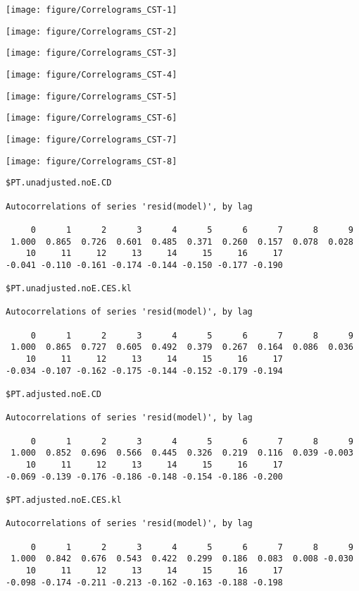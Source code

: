 \documentclass[preprint,authoryear,12pt]{elsarticle}\usepackage[]{graphicx}\usepackage[]{color}
\makeatletter
\def\maxwidth{ %
  \ifdim\Gin@nat@width>\linewidth
    \linewidth
  \else
    \Gin@nat@width
  \fi
}
\newenvironment{kframe}{%
 \def\at@end@of@kframe{}%
 \ifinner\ifhmode%
  \def\at@end@of@kframe{\end{minipage}}%
  \begin{minipage}{\columnwidth}%
 \fi\fi%
 \def\FrameCommand##1{\hskip\@totalleftmargin \hskip-\fboxsep
 \colorbox{shadecolor}{##1}\hskip-\fboxsep
     \hskip-\linewidth \hskip-\@totalleftmargin \hskip\columnwidth}%
 \MakeFramed {\advance\hsize-\width
   \@totalleftmargin\z@ \linewidth\hsize
   \@setminipage}}%
 {\par\unskip\endMakeFramed%
 \at@end@of@kframe}
\newenvironment{knitrout}{}{} %
\makeatother
\begin{document}
\begin{knitrout}
\color{fgcolor}
\texttt{[image: figure/Correlograms\_CST-1]} 

\texttt{[image: figure/Correlograms\_CST-2]} 

\texttt{[image: figure/Correlograms\_CST-3]} 

\texttt{[image: figure/Correlograms\_CST-4]} 

\texttt{[image: figure/Correlograms\_CST-5]} 

\texttt{[image: figure/Correlograms\_CST-6]} 

\texttt{[image: figure/Correlograms\_CST-7]} 

\texttt{[image: figure/Correlograms\_CST-8]} 
\begin{kframe}\begin{verbatim}
$PT.unadjusted.noE.CD

Autocorrelations of series 'resid(model)', by lag

     0      1      2      3      4      5      6      7      8      9 
 1.000  0.865  0.726  0.601  0.485  0.371  0.260  0.157  0.078  0.028 
    10     11     12     13     14     15     16     17 
-0.041 -0.110 -0.161 -0.174 -0.144 -0.150 -0.177 -0.190 

$PT.unadjusted.noE.CES.kl

Autocorrelations of series 'resid(model)', by lag

     0      1      2      3      4      5      6      7      8      9 
 1.000  0.865  0.727  0.605  0.492  0.379  0.267  0.164  0.086  0.036 
    10     11     12     13     14     15     16     17 
-0.034 -0.107 -0.162 -0.175 -0.144 -0.152 -0.179 -0.194 

$PT.adjusted.noE.CD

Autocorrelations of series 'resid(model)', by lag

     0      1      2      3      4      5      6      7      8      9 
 1.000  0.852  0.696  0.566  0.445  0.326  0.219  0.116  0.039 -0.003 
    10     11     12     13     14     15     16     17 
-0.069 -0.139 -0.176 -0.186 -0.148 -0.154 -0.186 -0.200 

$PT.adjusted.noE.CES.kl

Autocorrelations of series 'resid(model)', by lag

     0      1      2      3      4      5      6      7      8      9 
 1.000  0.842  0.676  0.543  0.422  0.299  0.186  0.083  0.008 -0.030 
    10     11     12     13     14     15     16     17 
-0.098 -0.174 -0.211 -0.213 -0.162 -0.163 -0.188 -0.198 


\end{verbatim}
\end{kframe}
\end{knitrout}
\end{document}
